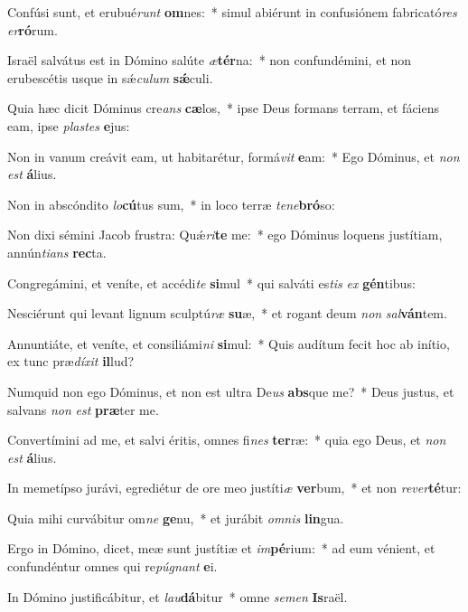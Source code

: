 \item Confúsi sunt, et erubué\textit{runt} \textbf{om}nes:~* simul abiérunt in confusiónem fabricató\textit{res} \textit{er}\textbf{ró}rum.
\item Israël salvátus est in Dómino salúte \textit{æ}\textbf{tér}na:~* non confundémini, et non erubescétis usque in sǽ\textit{cu}\textit{lum} \textbf{sǽ}culi.
\item Quia hæc dicit Dóminus cre\textit{ans} \textbf{cæ}los,~* ipse Deus formans terram, et fáciens eam, ipse \textit{plas}\textit{tes} \textbf{e}jus:
\item Non in vanum creávit eam, ut habitarétur, formá\textit{vit} \textbf{e}am:~* Ego Dóminus, et \textit{non} \textit{est} \textbf{á}lius.
\item Non in abscóndito \textit{lo}\textbf{cú}tus sum,~* in loco terræ \textit{te}\textit{ne}\textbf{bró}so:
\item Non dixi sémini Jacob frustra: Quǽ\textit{ri}\textbf{te} me:~* ego Dóminus loquens justítiam, annún\textit{ti}\textit{ans} \textbf{rec}ta.
\item Congregámini, et veníte, et accédi\textit{te} \textbf{si}mul~* qui salváti es\textit{tis} \textit{ex} \textbf{gén}tibus:
\item Nesciérunt qui levant lignum sculptú\textit{ræ} \textbf{su}æ,~* et rogant deum \textit{non} \textit{sal}\textbf{ván}tem.
\item Annuntiáte, et veníte, et consiliámi\textit{ni} \textbf{si}mul:~* Quis audítum fecit hoc ab inítio, ex tunc præ\textit{dí}\textit{xit} \textbf{il}lud?
\item Numquid non ego Dóminus, et non est ultra De\textit{us} \textbf{abs}que me?~* Deus justus, et salvans \textit{non} \textit{est} \textbf{præ}ter me.
\item Convertímini ad me, et salvi éritis, omnes fi\textit{nes} \textbf{ter}ræ:~* quia ego Deus, et \textit{non} \textit{est} \textbf{á}lius.
\item In memetípso jurávi, egrediétur de ore meo justíti\textit{æ} \textbf{ver}bum,~* et non \textit{re}\textit{ver}\textbf{té}tur:
\item Quia mihi curvábitur om\textit{ne} \textbf{ge}nu,~* et jurábit \textit{om}\textit{nis} \textbf{lin}gua.
\item Ergo in Dómino, dicet, meæ sunt justítiæ et \textit{im}\textbf{pé}rium:~* ad eum vénient, et confundéntur omnes qui re\textit{pú}\textit{gnant} \textbf{e}i.
\item In Dómino justificábitur, et \textit{lau}\textbf{dá}bitur~* omne \textit{se}\textit{men} \textbf{Is}raël.
